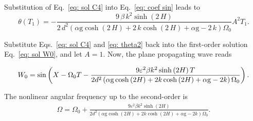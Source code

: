 Substitution of Eq.~\eqref{eq: sol C4} into Eq.~\eqref{eq: coef sin} leads to
\begin{equation}
    \theta \left( T_{1} \right) 
    = 
    -\frac {9\,\beta\,{k}^{2}  \sinh \left( 2\,H \right) }{2\,{d}^{2} \left( \alpha\mathrm{g}\cosh \left( 2\,H \right) +2\,k\cosh \left( 2\,H \right) +\alpha\mathrm{g}-2\,k \right) \Omega_0 }
    {A}^{2} T_{1}.
    \label{eq: theta2}
\end{equation}

Substitute Eqs.~\eqref{eq: sol C4} and \eqref{eq: theta2} back into the first-order solution Eq.~\eqref{eq: sol W0}, and let \ensuremath{A=1}. Now, the plane propagating wave reads

\begin{equation}
    \begin{aligned}
    W_{0}
    =
    \sin\left( X
    - \Omega_0 T
    -\frac {9\varepsilon^2 \beta{k}^{2}  \sinh \left( 2H \right) T }{2{d}^{2} \left( \alpha \mathrm{g} \cosh \left( 2H \right) +2k\cosh \left( 2H \right) +\alpha \mathrm{g}-2k \right) \Omega_0 }
     \right) .
    \end{aligned}
    \label{eq: sol W0 2nd}
\end{equation}

The nonlinear angular frequency up to the second-order is
\begin{equation}
    \begin{aligned}
        \Omega 
        =
        \Omega_0 + \frac {9\varepsilon^2 \beta{k}^{2}  \sinh \left( 2H \right) }{2{d}^{2} \left( \alpha \mathrm{g} \cosh \left( 2H \right) +2k\cosh \left( 2H \right) +\alpha \mathrm{g}-2k \right) \Omega_0 }.
    \end{aligned}
    \label{eq: sol Omega 2nd}
\end{equation}


